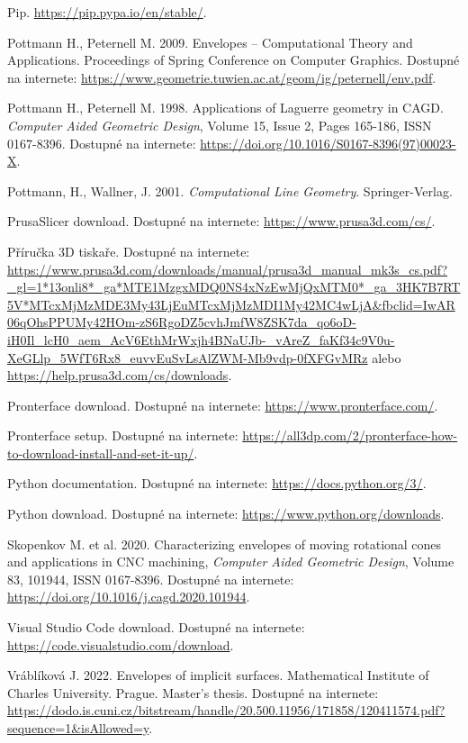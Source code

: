 \documentclass[12pt, twoside]{book}
\theoremstyle{definition}
\begin{document}
\begin{thebibliography}{99}
 Pip. \url{https://pip.pypa.io/en/stable/}.

 Pottmann H., Peternell M. 2009. Envelopes – Computational Theory and Applications. Proceedings of Spring Conference on Computer Graphics. Dostupné na internete: \url{https://www.geometrie.tuwien.ac.at/geom/ig/peternell/env.pdf}.

 Pottmann H., Peternell M. 1998. Applications of Laguerre geometry in CAGD. \textit{Computer Aided Geometric Design}, Volume 15, Issue 2, Pages 165-186, ISSN 0167-8396. Dostupné na internete: \url{https://doi.org/10.1016/S0167-8396(97)00023-X}.

 Pottmann, H., Wallner, J. 2001. \textit{Computational Line Geometry}. Springer-Verlag.

 PrusaSlicer download. Dostupné na internete: \url{https://www.prusa3d.com/cs/}.


 Příručka 3D tiskaře. Dostupné na internete: \url{https://www.prusa3d.com/downloads/manual/prusa3d_manual_mk3s_cs.pdf?_gl=1*13onli8*_ga*MTE1MzgxMDQ0NS4xNzEwMjQxMTM0*_ga_3HK7B7RT5V*MTcxMjMzMDE3My43LjEuMTcxMjMzMDI1My42MC4wLjA&fbclid=IwAR06qOhsPPUMy42HOm-zS6RgoDZ5cvhJmfW8ZSK7da_qo6oD-iH0Il_lcH0_aem_AcV6EthMrWxjh4BNaUJb-_vAreZ_faKf34c9V0u-XeGLlp_5WfT6Rx8_euvvEuSvLsAlZWM-Mb9vdp-0fXFGvMRz} alebo \url{https://help.prusa3d.com/cs/downloads}.

 Pronterface download. Dostupné na internete: \url{https://www.pronterface.com/}.

 Pronterface setup. Dostupné na internete: \url{https://all3dp.com/2/pronterface-how-to-download-install-and-set-it-up/}.

 Python documentation. Dostupné na internete: \url{https://docs.python.org/3/}.

 Python download. Dostupné na internete: \url{https://www.python.org/downloads}.

 Skopenkov M. et al. 2020. Characterizing envelopes of moving rotational cones and applications in CNC machining, \textit{Computer Aided Geometric Design}, Volume 83, 101944, ISSN 0167-8396. Dostupné na internete: \url{https://doi.org/10.1016/j.cagd.2020.101944}.

 Visual Studio Code download. Dostupné na internete: \url{https://code.visualstudio.com/download}.

 Vráblíková J. 2022. Envelopes of implicit surfaces. Mathematical Institute of Charles University. Prague. Master's thesis. Dostupné na internete: \url{https://dodo.is.cuni.cz/bitstream/handle/20.500.11956/171858/120411574.pdf?sequence=1&isAllowed=y}.


\end{thebibliography}
\end{document}
